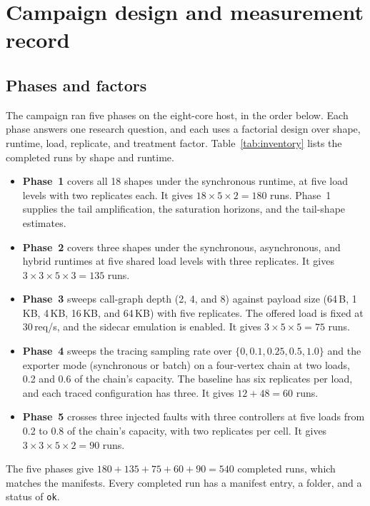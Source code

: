 \section{Campaign design and measurement record}
\label{sec:campaign}

\subsection{Phases and factors}

The campaign ran five phases on the eight-core host, in the order below. Each phase answers one research question, and each uses a factorial design over shape, runtime, load, replicate, and treatment factor. Table~\ref{tab:inventory} lists the completed runs by shape and runtime.

\begin{itemize}
\item \textbf{Phase~1} covers all 18 shapes under the synchronous runtime, at five load levels with two replicates each. It gives $18\times5\times2=180$ runs. Phase~1 supplies the tail amplification, the saturation horizons, and the tail-shape estimates.
\item \textbf{Phase~2} covers three shapes under the synchronous, asynchronous, and hybrid runtimes at five shared load levels with three replicates. It gives $3\times3\times5\times3=135$ runs.
\item \textbf{Phase~3} sweeps call-graph depth (2, 4, and 8) against payload size (64\,B, 1\,KB, 4\,KB, 16\,KB, and 64\,KB) with five replicates. The offered load is fixed at 30\,req/s, and the sidecar emulation is enabled. It gives $3\times5\times5=75$ runs.
\item \textbf{Phase~4} sweeps the tracing sampling rate over $\{0, 0.1, 0.25, 0.5, 1.0\}$ and the exporter mode (synchronous or batch) on a four-vertex chain at two loads, 0.2 and 0.6 of the chain's capacity. The baseline has six replicates per load, and each traced configuration has three. It gives $12+48=60$ runs.
\item \textbf{Phase~5} crosses three injected faults with three controllers at five loads from 0.2 to 0.8 of the chain's capacity, with two replicates per cell. It gives $3\times3\times5\times2=90$ runs.
\end{itemize}

The five phases give $180+135+75+60+90=540$ completed runs, which matches the manifests. Every completed run has a manifest entry, a folder, and a status of \texttt{ok}.

